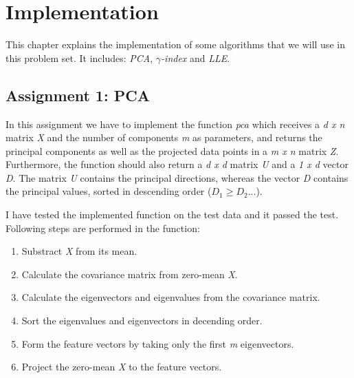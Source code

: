 \chapter{Implementation}
\label{implementation}

This chapter explains the implementation of some algorithms that we will use in this problem set. It includes: \textit{PCA}, \textit{$\gamma$-index} and \textit{LLE}.

\section{Assignment 1: PCA}
\label{sec:assignment1}

In this assignment we have to implement the function \textit{pca} which receives a \textit{d x n} matrix \textit{X} and the number of components \textit{m} as parameters, and returns the principal components as well as the projected data points in a \textit{m x n} matrix \textit{Z}. Furthermore, the function should also return a \textit{d x d} matrix \textit{U} and a \textit{1 x d} vector \textit{D}. The matrix \textit{U} contains the principal directions, whereas the vector \textit{D} contains the principal values, sorted in descending order ($D_1 \geq D_2 ...$).

I have tested the implemented function on the test data and it passed the test. Following steps are performed in the function:
\begin{enumerate}
	\item Substract \textit{X} from its mean.
	\item Calculate the covariance matrix from zero-mean \textit{X}.
	\item Calculate the eigenvectors and eigenvalues from the covariance matrix.
	\item Sort the eigenvalues and eigenvectors in decending order.
	\item Form the feature vectors by taking only the first \textit{m} eigenvectors.
	\item Project the zero-mean \textit{X} to the feature vectors.
\end{enumerate}


